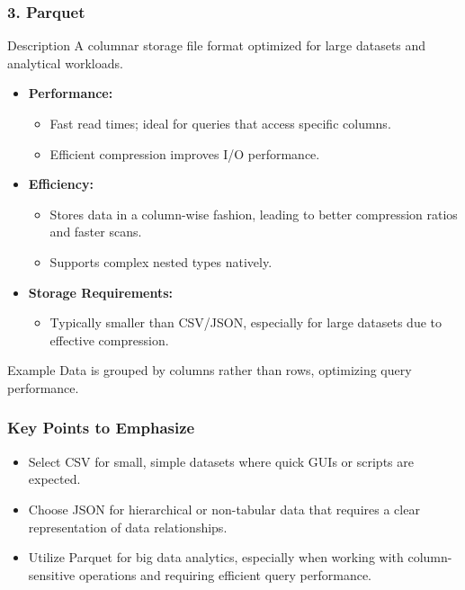 \documentclass[aspectratio=169]{beamer}
\begin{document}
\begin{frame}[fragile]
    \frametitle{3. Parquet}
    \begin{block}{Description}
        A columnar storage file format optimized for large datasets and analytical workloads.
    \end{block}
    \begin{itemize}
        \item \textbf{Performance:}
        \begin{itemize}
            \item Fast read times; ideal for queries that access specific columns.
            \item Efficient compression improves I/O performance.
        \end{itemize}
        \item \textbf{Efficiency:}
        \begin{itemize}
            \item Stores data in a column-wise fashion, leading to better compression ratios and faster scans.
            \item Supports complex nested types natively.
        \end{itemize}
        \item \textbf{Storage Requirements:} 
        \begin{itemize}
            \item Typically smaller than CSV/JSON, especially for large datasets due to effective compression.
        \end{itemize}
    \end{itemize}
    \begin{block}{Example}
        Data is grouped by columns rather than rows, optimizing query performance.
    \end{block}
\end{frame}

\begin{frame}
    \frametitle{Key Points to Emphasize}
    \begin{itemize}
        \item Select CSV for small, simple datasets where quick GUIs or scripts are expected.
        \item Choose JSON for hierarchical or non-tabular data that requires a clear representation of data relationships.
        \item Utilize Parquet for big data analytics, especially when working with column-sensitive operations and requiring efficient query performance.
    \end{itemize}
\end{frame}
\end{document}
